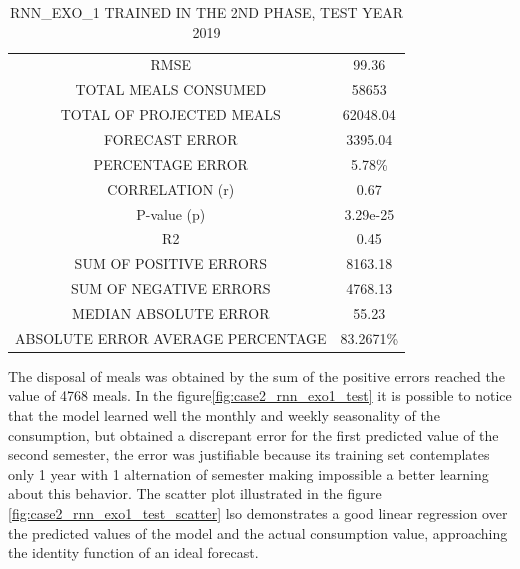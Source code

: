       
        \begin{table}[!h]
            \centering
            \caption{RNN\_EXO\_1 TRAINED IN THE 2ND PHASE, TEST YEAR 2019}
            \label{table:case2_rnn_exo_2_2019}
                \begin{tabular}{c|c}
                \rowcolor{gray!50}
                \hline
                \multicolumn{2}{c}{RNN\_EXO\_1 TRAINED IN THE 2ND PHASE, TEST YEAR 2019}\\ \hline
                RMSE & 99.36\\
                TOTAL MEALS CONSUMED & 58653 \\
                TOTAL OF PROJECTED MEALS & 62048.04\\
                FORECAST ERROR & 3395.04 \\
                PERCENTAGE ERROR  & 5.78\%  \\
                CORRELATION (r)& 0.67 \\
                P-value (p) & 3.29e-25\\
                R2 & 0.45\\
                SUM OF POSITIVE ERRORS  & 8163.18\\
                SUM OF NEGATIVE ERRORS  & 4768.13\\
                MEDIAN ABSOLUTE ERROR  & 55.23\\
                ABSOLUTE ERROR AVERAGE PERCENTAGE & 83.2671\% \\ \hline
            \end{tabular}
            \end{table}

    \newpage
     The disposal of meals was obtained by the sum of the positive errors reached the value of 4768 meals.
     In the figure\ref{fig:case2_rnn_exo1_test} it is possible to notice that the model learned well the monthly and weekly seasonality of the consumption, but obtained a discrepant error for the first predicted value of the second semester, the error was justifiable because its training set contemplates only 1 year with 1 alternation of semester making impossible a better learning about this behavior.
     The scatter plot illustrated in the figure \ref{fig:case2_rnn_exo1_test_scatter} lso demonstrates a good linear regression over the predicted values of the model and the actual consumption value, approaching the identity function of an ideal forecast.
     
